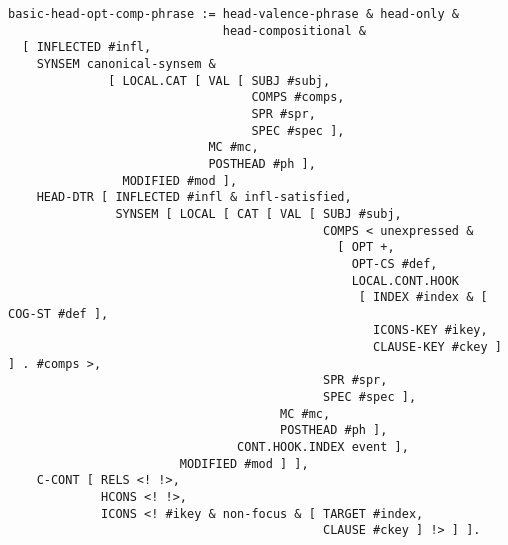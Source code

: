 \documentclass[a4paper]{article}
\begin{document}
{\small\begin{verbatim}
basic-head-opt-comp-phrase := head-valence-phrase & head-only &
                              head-compositional &
  [ INFLECTED #infl,
    SYNSEM canonical-synsem &
              [ LOCAL.CAT [ VAL [ SUBJ #subj,
                                  COMPS #comps,
                                  SPR #spr,
                                  SPEC #spec ],
                            MC #mc,
                            POSTHEAD #ph ],
                MODIFIED #mod ],
    HEAD-DTR [ INFLECTED #infl & infl-satisfied,
               SYNSEM [ LOCAL [ CAT [ VAL [ SUBJ #subj,
                                            COMPS < unexpressed &
                                              [ OPT +,
                                                OPT-CS #def,
                                                LOCAL.CONT.HOOK 
                                                 [ INDEX #index & [ COG-ST #def ],
                                                   ICONS-KEY #ikey,
                                                   CLAUSE-KEY #ckey ] ] . #comps >,
                                            SPR #spr,
                                            SPEC #spec ],
                                      MC #mc,
                                      POSTHEAD #ph ],
                                CONT.HOOK.INDEX event ],
                        MODIFIED #mod ] ],
    C-CONT [ RELS <! !>,
             HCONS <! !>,
             ICONS <! #ikey & non-focus & [ TARGET #index,
                                            CLAUSE #ckey ] !> ] ].
\end{verbatim}}
\end{document}
